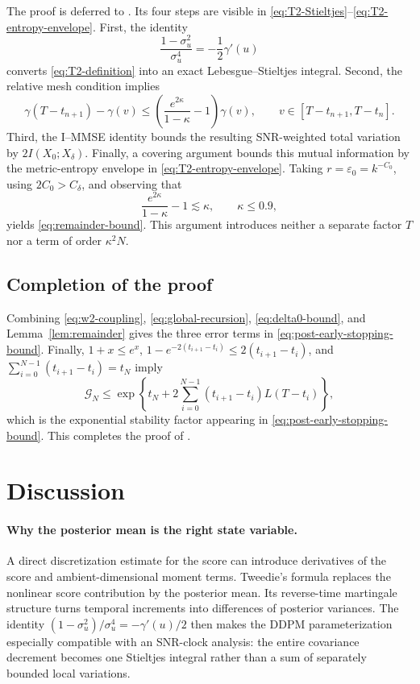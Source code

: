 \documentclass[11pt]{article}
\theoremstyle{definition}
\begin{document}
The proof is deferred to . Its four steps are
visible in \eqref{eq:T2-Stieltjes}--\eqref{eq:T2-entropy-envelope}.
First, the identity
\[
    \frac{1-\sigma_u^2}{\sigma_u^4}
    =-\frac12\gamma'(u)
\]
converts \eqref{eq:T2-definition} into an exact
Lebesgue--Stieltjes integral. Second, the relative mesh condition
implies
\[
    \gamma(T-t_{n+1})-\gamma(v)
    \le
    \left(\frac{e^{2\kappa}}{1-\kappa}-1\right)\gamma(v),
    \qquad v\in[T-t_{n+1},T-t_n].
\]
Third, the I--MMSE identity bounds the resulting SNR-weighted total
variation by $2I(X_0;X_\delta)$. Finally, a covering argument bounds
this mutual information by the metric-entropy envelope in
\eqref{eq:T2-entropy-envelope}. Taking
$r=\varepsilon_0=k^{-C_0}$, using
$2C_0>C_\delta$, and observing that
\[
    \frac{e^{2\kappa}}{1-\kappa}-1
    \lesssim\kappa,
    \qquad \kappa\le0.9,
\]
yields
\eqref{eq:remainder-bound}. This argument introduces neither a
separate factor $T$ nor a term of order $\kappa^2N$.

\subsection{Completion of the proof}

Combining \eqref{eq:w2-coupling}, \eqref{eq:global-recursion},
\eqref{eq:delta0-bound}, and Lemma~\ref{lem:remainder} gives the three
error terms in \eqref{eq:post-early-stopping-bound}. Finally,
$1+x\le e^x$, $1-e^{-2(t_{i+1}-t_i)}
\le2(t_{i+1}-t_i)$, and
$\sum_{i=0}^{N-1}(t_{i+1}-t_i)=t_N$ imply
\[
\mathcal G_N
\le\exp\left\{t_N
+2\sum_{i=0}^{N-1}(t_{i+1}-t_i)L(T-t_i)\right\},
\]
which is the exponential stability factor appearing in
\eqref{eq:post-early-stopping-bound}. This completes the proof of
.

\section{Discussion}
\label{sec:discussion}

\paragraph{Why the posterior mean is the right state variable.}
A direct discretization estimate for the score can introduce derivatives of the score and ambient-dimensional moment terms. Tweedie's formula replaces the nonlinear score contribution by the posterior mean. Its reverse-time martingale structure turns temporal increments into differences of posterior variances. The identity $(1-\sigma_u^2)/\sigma_u^4=-\gamma'(u)/2$ then makes the DDPM parameterization especially compatible with an SNR-clock analysis: the entire covariance decrement becomes one Stieltjes integral rather than a sum of separately bounded local variations.
\end{document}
